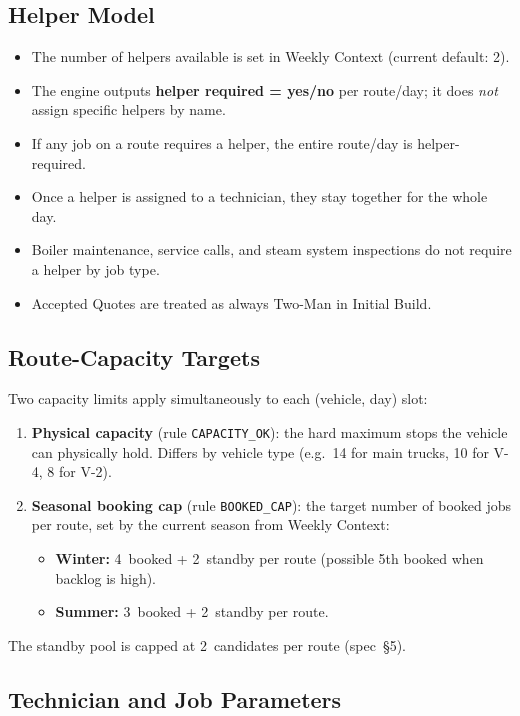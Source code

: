\documentclass[12pt]{article}
\begin{document}
\subsection*{Helper Model}
\begin{itemize}
    \item The number of helpers available is set in Weekly Context (current default: 2).
    \item The engine outputs \textbf{helper required = yes/no} per route/day; it does \emph{not} assign specific helpers by name.
    \item If any job on a route requires a helper, the entire route/day is helper-required.
    \item Once a helper is assigned to a technician, they stay together for the whole day.
    \item Boiler maintenance, service calls, and steam system inspections do not require a helper by job type.
    \item Accepted Quotes are treated as always Two-Man in Initial Build.
\end{itemize}

\subsection*{Route-Capacity Targets}
Two capacity limits apply simultaneously to each (vehicle, day) slot:
\begin{enumerate}
    \item \textbf{Physical capacity} (rule \texttt{CAPACITY\_OK}): the hard maximum stops the vehicle can physically hold. Differs by vehicle type (e.g.\ 14 for main trucks, 10 for V-4, 8 for V-2).
    \item \textbf{Seasonal booking cap} (rule \texttt{BOOKED\_CAP}): the target number of booked jobs per route, set by the current season from Weekly Context:
    \begin{itemize}
        \item \textbf{Winter:} 4~booked + 2~standby per route (possible 5th booked when backlog is high).
        \item \textbf{Summer:} 3~booked + 2~standby per route.
    \end{itemize}
\end{enumerate}
The standby pool is capped at 2~candidates per route (spec~\S5).

\subsection*{Technician and Job Parameters}
\end{document}
